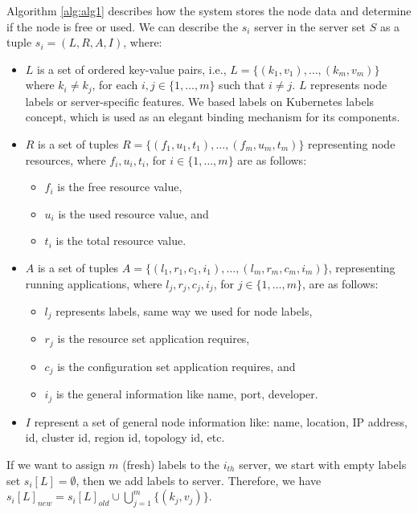 Algorithm \ref{alg:alg1} describes how the system stores the node data and determine if the node is free or used.
We can describe the $s_i$ server in the server set $S$ as a tuple $s_i = (L, R, A, I)$, where:

\begin{itemize}
	\item $L$ is a set of ordered key-value pairs, i.e., $L = \{(k_1,v_1),\ldots ,(k_m,v_m)\}$ where $k_i \not= k_j$, for each $i,j\in \{1, \ldots , m\}$ such that $i\not= j$. $L$ represents node labels or server-specific features.  
	We based labels on Kubernetes  \cite{RossiCPN20} labels concept, which is used as an elegant binding mechanism for its components.
	\item $R$ is a set of tuples $R = \{(f_1,u_1,t_1),\ldots ,(f_m,u_m,t_m)\}$ representing node resources, where $f_i,u_i,t_i$, for $i\in\{1,\ldots,m\}$ are as follows:
		\begin{itemize}
			\item $f_i$ is the free resource value, 
			\item $u_i$ is the used resource value, and 
			\item $t_i$ is the total resource value. 
		\end{itemize}
	\item $A$ is a set of tuples $A = \{(l_1,r_1,c_1,i_1), \ldots ,(l_m,r_m,c_m,i_m)\}$, representing running applications, where $l_j,r_j,c_j,i_j$, for $j\in\{1,\ldots,m\}$, are as follows: 
		\begin{itemize}
			\item  $l_j$ represents labels, same way we used for node labels, 
			\item $r_j$ is the resource set application requires, 
			\item $c_j$ is the configuration set application requires, and 
			\item $i_j$ is the general information like name, port, developer. 
		\end{itemize}
	\item $I$ represent a set of general node information like: name, location, IP address, id, cluster id, region id, topology id, etc.
\end{itemize}

If we want to assign $m$ (fresh) labels to the $i_\mathit{th}$ server, 
we start with empty labels set $s_i[L]=\emptyset$, then we add labels to server. Therefore, we have $s_i[L]_\mathit{new} = s_i[L]_\mathit{old} \cup \bigcup%
_{j=1}^{m} \{(k_j,v_j)\}$.

